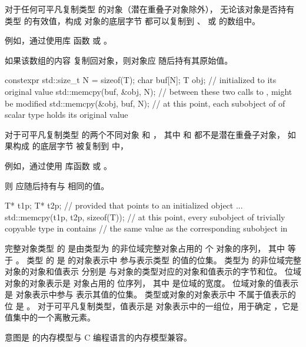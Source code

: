 \pnum
{}%
%
对于任何可平凡复制类型  的对象（潜在重叠子对象除外），
无论该对象是否持有类型  的有效值，构成
对象的底层字节 都可以复制到
、
 或
 的数组中。
\begin{footnote}
例如，通过使用库
函数  或 。
\end{footnote}
如果该数组的内容
复制回对象，则对象应
随后持有其原始值。
\begin{example}
\begin{codeblock}
constexpr std::size_t N = sizeof(T);
char buf[N];
T obj;                          //  initialized to its original value
std::memcpy(buf, &obj, N);      // between these two calls to ,  might be modified
std::memcpy(&obj, buf, N);      // at this point, each subobject of  of scalar type holds its original value
\end{codeblock}
\end{example}

\pnum
对于可平凡复制类型  的两个不同对象  和 ，
其中  和  都不是潜在重叠子对象，
如果构成
 的底层字节 被复制到  中，
\begin{footnote}
例如，通过使用
库函数  或 。
\end{footnote}
则  应随后持有与
 相同的值。
\begin{example}
\begin{codeblock}
T* t1p;
T* t2p;
    // provided that  points to an initialized object ...
std::memcpy(t1p, t2p, sizeof(T));
    // at this point, every subobject of trivially copyable type in  contains
    // the same value as the corresponding subobject in 
\end{codeblock}
\end{example}

\pnum
\label{term.object.representation}%
完整对象类型  的 
是由类型为  的非位域完整对象占用的
 个  对象的序列，
其中  等于
。
类型  的 
是  的对象表示中
参与表示类型  的值的位集。
类型为  的非位域完整对象的对象和值表示
分别是
与对象的类型对应的对象和值表示的字节和位。
位域对象的对象表示是
对象占用的  位序列，
其中  是位域的宽度。
位域对象的值表示是
对象表示中参与
表示其值的位集。
\label{term.padding.bits}%
类型或对象的对象表示中
不属于值表示的位
是 。
对于可平凡复制类型，值表示是
对象表示中的一组位，用于确定
，它是
 值集中的一个离散元素。
\begin{footnote}
意图是 \Cpp{} 的内存模型与 C 编程语言的内存模型兼容。
\end{footnote}

